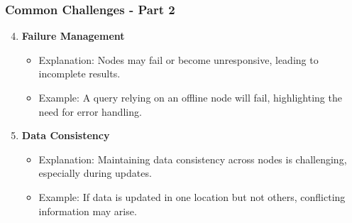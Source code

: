 \documentclass[aspectratio=169]{beamer}
\begin{document}
\begin{frame}[fragile]
    \frametitle{Common Challenges - Part 2}
    
    \begin{enumerate}
        \setcounter{enumi}{3} %
        
        \item \textbf{Failure Management}
            \begin{itemize}
                \item Explanation: Nodes may fail or become unresponsive, leading to incomplete results.
                \item Example: A query relying on an offline node will fail, highlighting the need for error handling.
            \end{itemize}

        \item \textbf{Data Consistency}
            \begin{itemize}
                \item Explanation: Maintaining data consistency across nodes is challenging, especially during updates.
                \item Example: If data is updated in one location but not others, conflicting information may arise.
            \end{itemize}
    \end{enumerate}
\end{frame}
\end{document}
